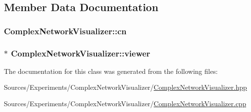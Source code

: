 \subsection{Member Data Documentation}
\hypertarget{class_complex_network_visualizer_afa26bcc018204f4c6cc11113ccc28762}{
\subsubsection[{cn}]{ Complex\+Network\+Visualizer\+::cn\hspace{0.3cm}{\ttfamily [private]}}}\label{class_complex_network_visualizer_afa26bcc018204f4c6cc11113ccc28762}
\hypertarget{class_complex_network_visualizer_a4bf3a5e10e49bc3add70d1db9aa16fa2}{
\subsubsection[{viewer}]{$\ast$ Complex\+Network\+Visualizer\+::viewer\hspace{0.3cm}{\ttfamily [private]}}}\label{class_complex_network_visualizer_a4bf3a5e10e49bc3add70d1db9aa16fa2}


The documentation for this class was generated from the following files\+:\begin{DoxyCompactItemize}
\item 
Sources/\+Experiments/\+Complex\+Network\+Visualizer/\hyperlink{_complex_network_visualizer_8hpp}{Complex\+Network\+Visualizer.\+hpp}\item 
Sources/\+Experiments/\+Complex\+Network\+Visualizer/\hyperlink{_complex_network_visualizer_8cpp}{Complex\+Network\+Visualizer.\+cpp}\end{DoxyCompactItemize}
